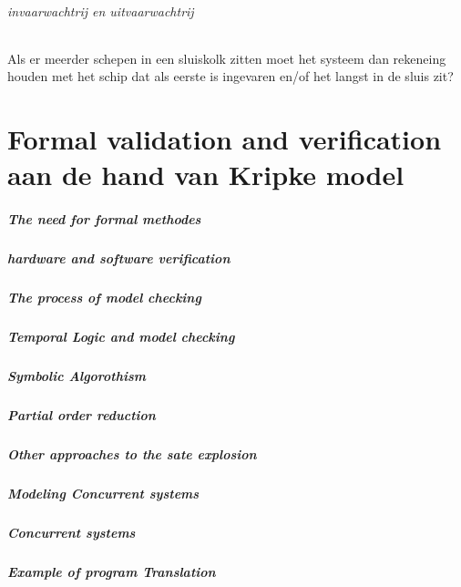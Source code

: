 \subparagraph{invaarwachtrij en uitvaarwachtrij}
Als er meerder schepen in een sluiskolk zitten moet het systeem dan rekeneing houden met het schip dat als eerste is ingevaren en/of het langst in de sluis zit?





\chapter{Formal validation and verification aan de hand van Kripke model}

\paragraph{The need for formal methodes}
\paragraph{hardware and software verification}
\paragraph{The process of model checking}
\paragraph{Temporal Logic and model checking}
\paragraph{Symbolic  Algorothism}
\paragraph{Partial order reduction}
\paragraph{Other approaches to the sate explosion}
\paragraph{Modeling Concurrent systems}
\paragraph{Concurrent systems}
\paragraph{Example of program Translation}
